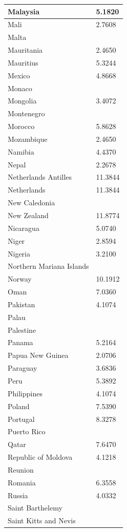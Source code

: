 \documentclass[12pt]{article}
\begin{document}
\begin{longtable}{|p{}|p{}|}
Malaysia&5.1820 \\\hline
Mali&2.7608 \\\hline
Malta& \\\hline
Mauritania&2.4650 \\\hline
Mauritius&5.3244 \\\hline
Mexico&4.8668 \\\hline
Monaco& \\\hline
Mongolia&3.4072 \\\hline
Montenegro& \\\hline
Morocco&5.8628 \\\hline
Mozambique&2.4650 \\\hline
Namibia&4.4370 \\\hline
Nepal&2.2678 \\\hline
Netherlands Antilles&11.3844 \\\hline
Netherlands&11.3844 \\\hline
New Caledonia& \\\hline
New Zealand&11.8774 \\\hline
Nicaragua&5.0740 \\\hline
Niger&2.8594 \\\hline
Nigeria&3.2100 \\\hline
Northern Mariana Islands& \\\hline
Norway&10.1912 \\\hline
Oman&7.0360 \\\hline
Pakistan&4.1074 \\\hline
Palau& \\\hline
Palestine& \\\hline
Panama&5.2164 \\\hline
Papua New Guinea&2.0706 \\\hline
Paraguay&3.6836 \\\hline
Peru&5.3892 \\\hline
Philippines&4.1074 \\\hline
Poland&7.5390 \\\hline
Portugal&8.3278 \\\hline
Puerto Rico& \\\hline
Qatar&7.6470 \\\hline
Republic of Moldova&4.1218 \\\hline
Reunion& \\\hline
Romania&6.3558 \\\hline
Russia&4.0332 \\\hline
Saint Barthelemy& \\\hline
Saint Kitts and Nevis& \\\hline

\end{longtable}
\end{document}
